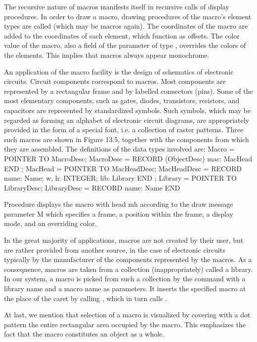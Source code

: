The recursive nature of macros manifests itself in recursive calls of display procedures. In order to draw a macro, drawing procedures of the macro's element types are called (which may be macros again). The coordinates of the macro are added to the coordinates of each element, which function as offsets. The color value of the macro, also a field of the parameter of type , overrides the colors of the elements. This implies that macros always appear monochrome.

An application of the macro facility is the design of schematics of electronic circuits. Circuit components correspond to macros. Most components are represented by a rectangular frame and by labelled connectors (pins). Some of the most elementary components, such as gates, diodes, transistors, resistors, and capacitors are represented by standardized symbols. Such symbols, which may be regarded as forming an alphabet of electronic circuit diagrams, are appropriately provided in the form of a special font, i.e. a collection of raster patterns. Three such macros are shown in Figure 13.5, together with the components from which they are assembled. The definitions of the data types involved are:
\begintt
Macro =       POINTER TO MacroDesc;
MacroDesc =   RECORD (ObjectDesc) mac: MacHead END ;
MacHead =     POINTER TO MacHeadDesc;
MacHeadDesc = RECORD name: Name;
                w, h: INTEGER; lib: Library
              END ;
Library =     POINTER TO LibraryDesc;
LibraryDesc = RECORD name: Name END
\endtt

Procedure  displays the macro with head mh according to the draw message parameter M which specifies a frame, a position within the frame, a display mode, and an overriding color.

In the great majority of applications, macros are not created by their user, but are rather provided from another source, in the case of electronic circuits typically by the manufacturer of the components represented by the macros. As a consequence, macros are taken from a collection (inappropriately) called a library. In our system, a macro is picked from such a collection by the command  with a library name and a macro name as parameters. It inserts the specified macro at the place of the caret by calling , which in turn calls .

At last, we mention that selection of a macro is visualized by covering with a dot pattern the entire rectangular area occupied by the macro. This emphasizes the fact that the macro constitutes an object as a whole.

